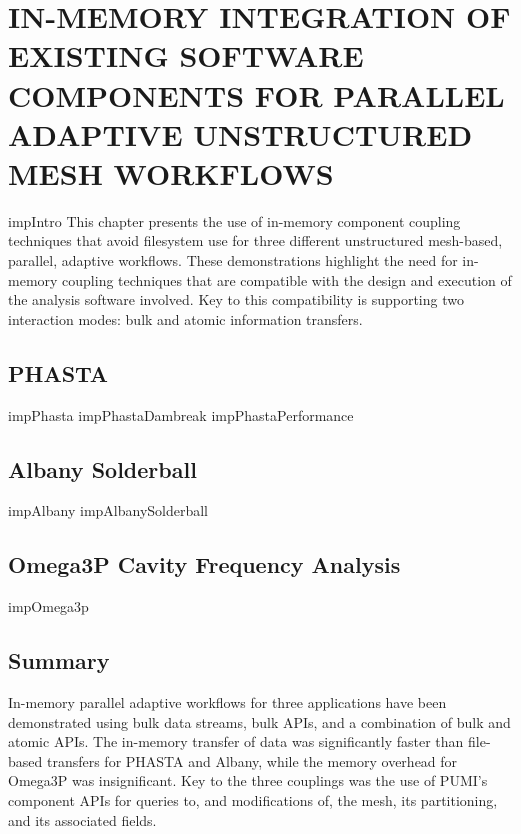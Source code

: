 \chapter{IN-MEMORY INTEGRATION OF EXISTING SOFTWARE COMPONENTS FOR PARALLEL
ADAPTIVE UNSTRUCTURED MESH WORKFLOWS}
\label{chp:inmem}
{impIntro}
This chapter presents the use of in-memory component coupling techniques that
avoid filesystem use for three different unstructured mesh-based, parallel,
adaptive workflows.
These demonstrations highlight the need for in-memory coupling techniques that
are compatible with the design and execution of the analysis software involved.
Key to this compatibility is supporting two interaction modes: bulk and
atomic information transfers.

\section{PHASTA}\label{sec:imp_phasta}
{impPhasta}
{impPhastaDambreak}
{impPhastaPerformance}
\section{Albany Solderball}\label{sec:imp_albany}
{impAlbany}
{impAlbanySolderball}
\section{Omega3P Cavity Frequency Analysis}\label{sec:imp_omega3p}
{impOmega3p}

\section{Summary}
In-memory parallel adaptive workflows for three applications have been
demonstrated using bulk data streams, bulk APIs, and a combination of bulk and
atomic APIs.
The in-memory transfer of data was significantly faster than
file-based transfers for PHASTA and Albany, while the memory overhead for Omega3P
was insignificant.
Key to the three couplings was the use of PUMI's component APIs for queries to, and
modifications of, the mesh, its partitioning, and its associated fields.
